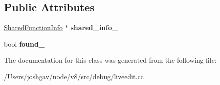 \subsection*{Public Attributes}
\begin{DoxyCompactItemize}
\item 
\hyperlink{classv8_1_1internal_1_1_shared_function_info}{Shared\+Function\+Info} $\ast$ {\bfseries shared\+\_\+info\+\_\+}\hypertarget{classv8_1_1internal_1_1_dependent_function_marker_a1aaf31b42c378b1b17e0c855f8ea4dd8}{}\label{classv8_1_1internal_1_1_dependent_function_marker_a1aaf31b42c378b1b17e0c855f8ea4dd8}

\item 
bool {\bfseries found\+\_\+}\hypertarget{classv8_1_1internal_1_1_dependent_function_marker_a9ace0cfb707a5e92d407e09fc9611581}{}\label{classv8_1_1internal_1_1_dependent_function_marker_a9ace0cfb707a5e92d407e09fc9611581}

\end{DoxyCompactItemize}


The documentation for this class was generated from the following file\+:\begin{DoxyCompactItemize}
\item 
/\+Users/joshgav/node/v8/src/debug/liveedit.\+cc\end{DoxyCompactItemize}
